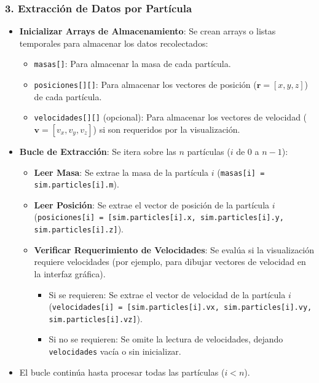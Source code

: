 \subsubsection*{3. Extracción de Datos por Partícula}
\begin{itemize}
    \item \textbf{Inicializar Arrays de Almacenamiento}: Se crean arrays o listas temporales para almacenar los datos recolectados:
    \begin{itemize}
        \item \texttt{masas[]}: Para almacenar la masa de cada partícula.
        \item \texttt{posiciones[][]}: Para almacenar los vectores de posición ($\mathbf{r} = [x, y, z]$) de cada partícula.
        \item \texttt{velocidades[][]} (opcional): Para almacenar los vectores de velocidad ($\mathbf{v} = [v_x, v_y, v_z]$) si son requeridos por la visualización.
    \end{itemize}
    \item \textbf{Bucle de Extracción}: Se itera sobre las $n$ partículas ($i$ de 0 a $n-1$):
    \begin{itemize}
        \item \textbf{Leer Masa}: Se extrae la masa de la partícula $i$ (\texttt{masas[i] = sim.particles[i].m}).
        \item \textbf{Leer Posición}: Se extrae el vector de posición de la partícula $i$ (\texttt{posiciones[i] = [sim.particles[i].x, sim.particles[i].y, sim.particles[i].z]}).
        \item \textbf{Verificar Requerimiento de Velocidades}: Se evalúa si la visualización requiere velocidades (por ejemplo, para dibujar vectores de velocidad en la interfaz gráfica).
        \begin{itemize}
             \item Si se requieren: Se extrae el vector de velocidad de la partícula $i$ (\texttt{velocidades[i] = [sim.particles[i].vx, sim.particles[i].vy, sim.particles[i].vz]}).
             \item Si no se requieren: Se omite la lectura de velocidades, dejando \texttt{velocidades} vacía o sin inicializar.
        \end{itemize}
    \end{itemize}
    \item El bucle continúa hasta procesar todas las partículas ($i < n$).
\end{itemize}

